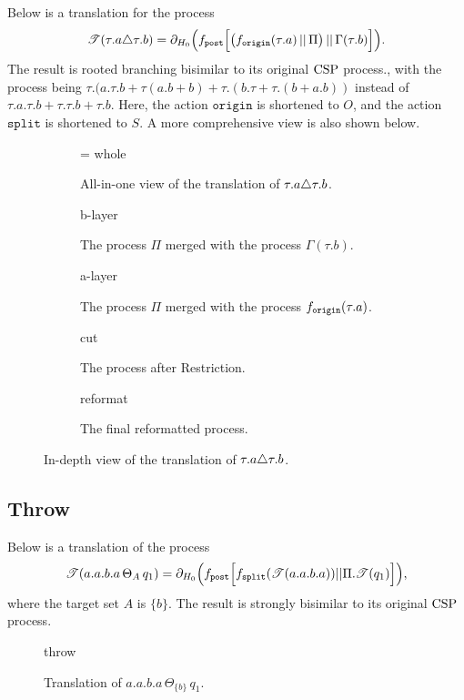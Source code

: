 \documentclass[../hons_project.tex]{subfiles}
\begin{document}
Below is a translation for the process
\begin{equation}
	\mathscr{T}(\tau.a \triangle \tau.b) = \partial_{H_{0}}\Bigl(f_{\mathtt{post}}\Bigl[ \bigl(f_{\mathtt{origin}}(\tau.a) \,\vert\vert\, \Pi\bigr) \,\vert\vert\, \Gamma(\tau.b) \Bigr]\Bigr).
\end{equation}
The result is rooted branching bisimilar to its original $\mathrm{CSP}$ process., with the process being $\tau.(a.\tau.b + \tau(a.b+b) + \tau.(b.\tau + \tau.(b + a.b))$ instead of $\tau.a.\tau.b + \tau.\tau.b + \tau.b$. Here, the action $\mathtt{origin}$ is shortened to $O$, and the action $\mathtt{split}$ is shortened to $S$. A more comprehensive view is also shown below.

\begin{figure}[H]
	\centering
	\begin{subfigure}[b]{\textwidth}
		\hfuzz=\maxdimen
		{whole}
		\caption{All-in-one view of the translation of $\tau.a \triangle \tau.b$.}
	\end{subfigure} \hfill

	\begin{subfigure}[b]{0.55\textwidth}
		{b-layer}
		\caption{The process $\Pi$ merged with the process $\Gamma(\tau.b)$.}
	\end{subfigure}
	\hfill
	\begin{subfigure}[b]{0.43\textwidth}
		{a-layer}
		\caption{The process $\Pi$ merged with the process $f_{\mathtt{origin}}(\tau.a)$.}
	\end{subfigure}\hfill

	\begin{subfigure}[b]{0.55\textwidth}
		{cut}
		\caption{The process after Restriction.}
	\end{subfigure}\hfill
	\begin{subfigure}[b]{0.4\textwidth}
		{reformat}
		\caption{The final reformatted process.}
	\end{subfigure}
	\caption{In-depth view of the translation of $\tau.a \triangle \tau.b$.}
\end{figure}

\newpage
\subsection{Throw}\label{ssec:diagrams-throw}

Below is a translation of the process
\begin{equation}
	\mathscr{T}(a.a.b.a \,\Theta_{A}\, q_{1})     = \partial_{H_{0}}\Bigl(f_{\mathtt{post}} \Bigl[ f_{\mathtt{split}}(\mathscr{T}(a.a.b.a)) | | \Pi.\mathscr{T}(q_{1}) \Bigr]\Bigr),
\end{equation}
where the target set $A$ is $\{b\}$. The result is strongly bisimilar to its original $\mathrm{CSP}$ process.
\vspace{-25pt}
\begin{figure}[H]
	\centering
	{throw}
	\caption{Translation of $a.a.b.a \,\Theta_{\{b\}}\, q_{1}$.}
\end{figure}
\end{document}
